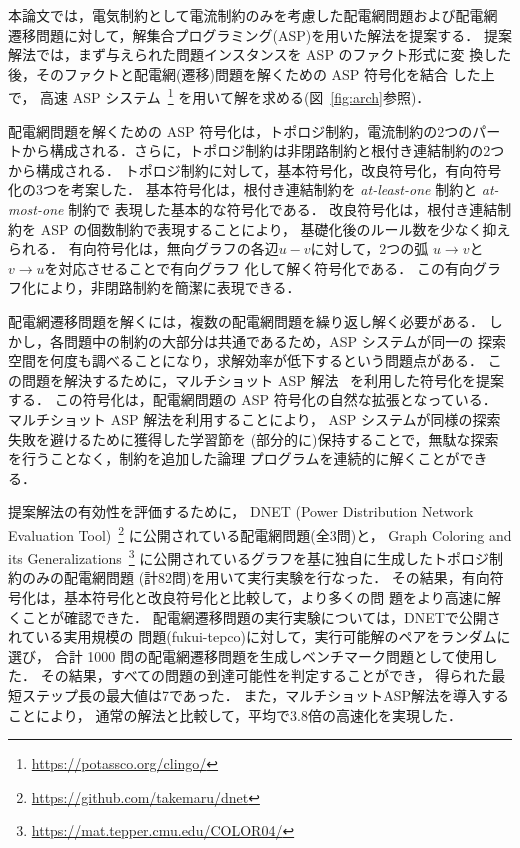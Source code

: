 \begin{figure*}[t]
 \centering
 \scalebox{0.85}{}
 \caption{提案解法の概要図}
 \label{fig:arch}
\end{figure*}

本論文では，電気制約として電流制約のみを考慮した配電網問題および配電網
遷移問題に対して，解集合プログラミング(ASP)を用いた解法を提案する．
提案解法では，まず与えられた問題インスタンスを ASP のファクト形式に変
換した後，そのファクトと配電網(遷移)問題を解くための ASP 符号化を結合
した上で，
高速 ASP システム{\clingo}~\footnote{\url{https://potassco.org/clingo/}}
を用いて解を求める(図~\ref{fig:arch}参照)．

配電網問題を解くための ASP 符号化は，トポロジ制約，電流制約の2つのパー
トから構成される．さらに，トポロジ制約は非閉路制約と根付き連結制約の2つ
から構成される．
トポロジ制約に対して，基本符号化，改良符号化，有向符号化の3つを考案した．
基本符号化は，根付き連結制約を \textit{at-least-one} 制約と \textit{at-most-one} 制約で
表現した基本的な符号化である．
改良符号化は，根付き連結制約を ASP の個数制約で表現することにより，
基礎化後のルール数を少なく抑えられる．
有向符号化は，無向グラフの各辺$u-v$に対して，2つの弧
$u\rightarrow v$と$v\rightarrow u$を対応させることで有向グラフ
化して解く符号化である．
この有向グラフ化により，非閉路制約を簡潔に表現できる．

配電網遷移問題を解くには，複数の配電網問題を繰り返し解く必要がある．
しかし，各問題中の制約の大部分は共通であるため，ASP システムが同一の
探索空間を何度も調べることになり，求解効率が低下するという問題点がある．
この問題を解決するために，マルチショット ASP 解法~\cite{DBLP:conf/rweb/KaminskiSW17}
を利用した符号化を提案する．
この符号化は，配電網問題の ASP 符号化の自然な拡張となっている．
マルチショット ASP 解法を利用することにより，
ASP システムが同様の探索失敗を避けるために獲得した学習節を
(部分的に)保持することで，無駄な探索を行うことなく，制約を追加した論理
プログラムを連続的に解くことができる．



提案解法の有効性を評価するために，
DNET (Power Distribution Network Evaluation Tool)~\footnote{%
\url{https://github.com/takemaru/dnet}}
に公開されている配電網問題(全3問)と，
Graph Coloring and its Generalizations~\footnote{%
\url{https://mat.tepper.cmu.edu/COLOR04/}}
に公開されているグラフを基に独自に生成したトポロジ制約のみの配電網問題
(計82問)を用いて実行実験を行なった．
その結果，有向符号化は，基本符号化と改良符号化と比較して，より多くの問
題をより高速に解くことが確認できた．
%
配電網遷移問題の実行実験については，DNETで公開されている実用規模の
問題({\sf fukui-tepco})に対して，実行可能解のペアをランダムに選び，
合計 1000 問の配電網遷移問題を生成しベンチマーク問題として使用した．
その結果，すべての問題の到達可能性を判定することができ，
得られた最短ステップ長の最大値は7であった．
また，マルチショットASP解法を導入することにより，
通常の解法と比較して，平均で3.8倍の高速化を実現した．

